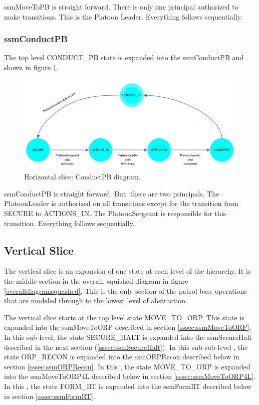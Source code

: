 \documentclass[../../main/main.tex]{subfiles}
\begin{document}
ssmMoveToPB is straight forward. There is only one principal authorized to make transitions.  This is the Platoon Leader.  Everything follows sequentially.  
\clearpage
\subsubsection{ssmConductPB}\label{sssec:ssmConductPB}
The top level CONDUCT_PB state is expanded into the ssmConductPB  and shown in figure \ref{ssmConductPBDiagram}.

\begin{figure}[h!]
\centering
\includegraphics[width=\textwidth]{../figures/ssmConductPBDiagram}
\caption{\label{ssmConductPBDiagram} Horizontal slice: ConductPB diagram.}
\end{figure}

ssmConductPB is straight forward. But, there are two principals. The PlatoonLeader is authorized on all transitions except for the transition from SECURE to ACTIONS_IN.  The PlatoonSergeant is responsible for this transition.  Everything follows sequentially.  
\clearpage

\subsection{Vertical Slice}\label{ssec:verticalslice}
The vertical slice is an expansion of one state at each level of the hierarchy.  It is the middle section in the overall, squished diagram in figure \ref{overalldiagramsquashed}.  This is the only section of the patrol base operations that are modeled through to the lowest level of abstraction.

The vertical slice starts at the top level state MOVE_TO_ORP.  This state is expanded into the ssmMoveToORP  described in section \ref{sssec:ssmMoveToORP}. In this sub level, the state SECURE_HALT is expanded into the ssmSecureHalt  described in the next section (\ref{sssec:ssmSecureHalt}).  In this sub-sub-level , the state ORP_RECON is expanded into the ssmORPRecon  described below in section \ref{sssec:ssmORPRecon}.  In this , the state MOVE_TO_ORP is expanded into the ssmMoveToORP4L  described below in section \ref{sssec:ssmMoveToORP4L}.  In this , the state FORM_RT is expanded into the ssmFormRT  described below in section \ref{sssec:ssmFormRT}.  
\end{document}

